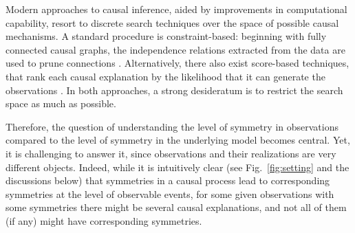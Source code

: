 \documentclass[aps,physrev,reprint,superscriptaddress,nofootinbib,twocolumn]{revtex4-2}
\begin{document}
Modern approaches to causal inference, aided by improvements in computational capability, resort to discrete search techniques over the space of possible causal mechanisms.
A standard procedure is constraint-based: beginning with fully connected causal graphs, the independence relations extracted from the data are used to prune connections \cite{pasquato2023}.
Alternatively, there also exist score-based techniques, that rank each causal explanation by the likelihood that it can generate the observations \cite{jin2024}.
In both approaches, a strong desideratum is to restrict the search space as much as possible.

Therefore, the question of understanding the level of symmetry in observations compared to the level of symmetry in the underlying model becomes central.
Yet, it is challenging to answer it, since observations and their realizations are very different objects.
Indeed, while it is intuitively clear (see Fig.~\ref{fig:setting} and the discussions below) that symmetries in a causal process lead to corresponding symmetries at the level of observable events, for some given observations with some symmetries there might be several causal explanations, and not all of them (if any) might have corresponding symmetries.
\end{document}
